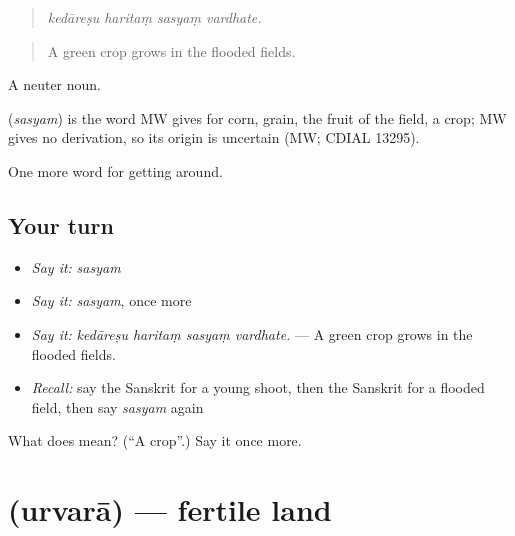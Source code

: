 \begin{quote}
   
\end{quote}

\begin{quote}
\emph{kedāreṣu haritaṃ sasyaṃ vardhate.}
\end{quote}

\begin{quote}
A green crop grows in the flooded fields.
\end{quote}

A neuter noun.

\begin{cousinweb}
\textbf{} (\emph{sasyam}) is the word MW gives for corn, grain, the fruit of the field, a crop; MW gives no derivation, so its origin is uncertain (MW; CDIAL 13295).
\end{cousinweb}

\begin{grammarlens}[title={What you've built}]
One more word for getting around.
\end{grammarlens}

\subsection*{Your turn}
\begin{itemize}
\raggedright
  \item \emph{Say it:} \emph{sasyam}
  \item \emph{Say it:} \emph{sasyam}, once more
  \item \emph{Say it:} \emph{kedāreṣu haritaṃ sasyaṃ vardhate.} — A green crop grows in the flooded fields.
  \item \emph{Recall:} say the Sanskrit for a young shoot, then the Sanskrit for a flooded field, then say \emph{sasyam} again
\end{itemize}

\begin{tcolorbox}[breakable,colback=teal!4,colframe=teal!35!black,title={Before you move on}]
What does  mean? (\textquotedblleft{}A crop\textquotedblright{}.) Say it once more.
\end{tcolorbox}
\section[\texorpdfstring{\sk{उर्वरा} (urvarā)}{उर्वरा (urvarā)}]{ (urvarā) — fertile land}

\label{lesson:SA-C447-urvara}



